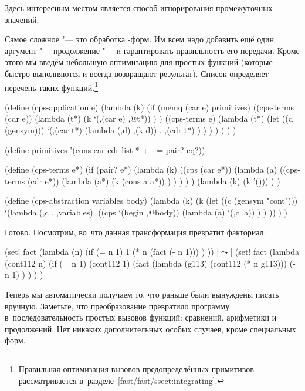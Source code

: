 \noindent
Здесь интересным местом является способ игнорирования промежуточных значений.

Самое сложное "--- это обработка -форм. Им всем надо добавить
ещё один аргумент "--- продолжение "--- и гарантировать правильность его
передачи. Кроме этого мы введём небольшую оптимизацию для простых функций
(которые быстро выполняются и всегда возвращают результат). Список
 определяет перечень таких функций.\footnote*{Правильная
оптимизация вызовов предопределённых примитивов рассматривается
в~разделе~\ref{fast/fast/ssect:integrating}.}

\begin{code:lisp}
(define (cps-application e)
  (lambda (k)
    (if (memq (car e) primitives)
        ((cps-terms (cdr e))
         (lambda (t*)
           (k `(,(car e) ,@t*)) ) )
        ((cps-terms e)
         (lambda (t*)
           (let ((d (gensym)))
             `(,(car t*) (lambda (,d) ,(k d))
                         . ,(cdr t*) ) ) ) ) ) ) )

(define primitives '(cons car cdr list * + - = pair? eq?))

(define (cps-terms e*)
  (if (pair? e*)
      (lambda (k)
        ((cps (car e*))
         (lambda (a)
           ((cps-terms (cdr e*))
            (lambda (a*)
              (k (cons a a*)) ) ) ) ) )
      (lambda (k) (k '())) ) )

(define (cps-abstraction variables body)
  (lambda (k)
    (k (let ((c (gensym "cont")))
         `(lambda (,c . ,variables)
            ,((cps `(begin ,@body))
              (lambda (a) `(,c ,a)) ) ) )) ) )
\end{code:lisp}

\noindent
Готово. Посмотрим, во~что данная трансформация превратит факториал:

\begin{code:lisp}
(set! fact (lambda (n)
             (if (= n 1) 1
                 (* n (fact (- n 1))) ) ))
|$\leadsto$| (set! fact
         (lambda (cont112 n)
           (if (= n 1)
               (cont112 1)
               (fact (lambda (g113) (cont112 (* n g113)))
                     (- n 1) ) ) ) )
\end{code:lisp}

Теперь мы автоматически получаем то, что раньше были вынуждены писать вручную.
Заметьте, что преобразование превратило программу в~последовательность простых
вызовов функций: сравнений, арифметики и продолжений. Нет никаких дополнительных
особых случаев, кроме специальных форм.

